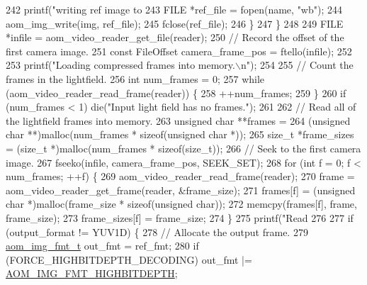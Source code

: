 \begin{DoxyCodeInclude}
{{{{{242       printf(\textcolor{stringliteral}{"writing ref image to %
243       FILE *ref\_file = fopen(name, \textcolor{stringliteral}{"wb"});
244       aom\_img\_write(img, ref\_file);
245       fclose(ref\_file);
246     \}
247   \}
248 
249   FILE *infile = aom\_video\_reader\_get\_file(reader);
250   \textcolor{comment}{// Record the offset of the first camera image.}
251   \textcolor{keyword}{const} FileOffset camera\_frame\_pos = ftello(infile);
252 
253   printf(\textcolor{stringliteral}{"Loading compressed frames into memory.\(\backslash\)n"});
254 
255   \textcolor{comment}{// Count the frames in the lightfield.}
256   \textcolor{keywordtype}{int} num\_frames = 0;
257   \textcolor{keywordflow}{while} (aom\_video\_reader\_read\_frame(reader)) \{
258     ++num\_frames;
259   \}
260   \textcolor{keywordflow}{if} (num\_frames < 1) die(\textcolor{stringliteral}{"Input light field has no frames."});
261 
262   \textcolor{comment}{// Read all of the lightfield frames into memory.}
263   \textcolor{keywordtype}{unsigned} \textcolor{keywordtype}{char} **frames =
264       (\textcolor{keywordtype}{unsigned} \textcolor{keywordtype}{char} **)malloc(num\_frames * \textcolor{keyword}{sizeof}(\textcolor{keywordtype}{unsigned} \textcolor{keywordtype}{char} *));
265   \textcolor{keywordtype}{size\_t} *frame\_sizes = (\textcolor{keywordtype}{size\_t} *)malloc(num\_frames * \textcolor{keyword}{sizeof}(\textcolor{keywordtype}{size\_t}));
266   \textcolor{comment}{// Seek to the first camera image.}
267   fseeko(infile, camera\_frame\_pos, SEEK\_SET);
268   \textcolor{keywordflow}{for} (\textcolor{keywordtype}{int} f = 0; f < num\_frames; ++f) \{
269     aom\_video\_reader\_read\_frame(reader);
270     frame = aom\_video\_reader\_get\_frame(reader, &frame\_size);
271     frames[f] = (\textcolor{keywordtype}{unsigned} \textcolor{keywordtype}{char} *)malloc(frame\_size * \textcolor{keyword}{sizeof}(\textcolor{keywordtype}{unsigned} \textcolor{keywordtype}{char}));
272     memcpy(frames[f], frame, frame\_size);
273     frame\_sizes[f] = frame\_size;
274   \}
275   printf(\textcolor{stringliteral}{"Read %
276 
277   \textcolor{keywordflow}{if} (output\_format != YUV1D) \{
278     \textcolor{comment}{// Allocate the output frame.}
279     \hyperlink{aom__image_8h_ab71efff8c7f49380fad23b93bc2e9bfc}{aom\_img\_fmt\_t} out\_fmt = ref\_fmt;
280     \textcolor{keywordflow}{if} (FORCE\_HIGHBITDEPTH\_DECODING) out\_fmt |= \hyperlink{aom__image_8h_a607b37d91f75442f54223ecd85f1b6cb}{AOM\_IMG\_FMT\_HIGHBITDEPTH};
}}}}}}}
\end{DoxyCodeInclude}
